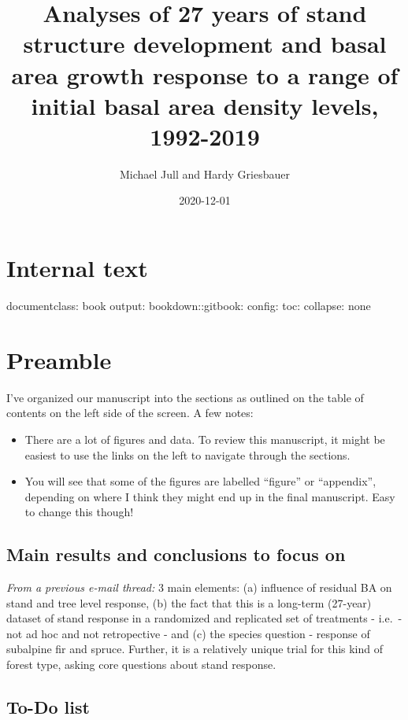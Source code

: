 \documentclass[
]{article}
\title{Analyses of 27 years of stand structure development and basal area growth response to a range of initial basal area density levels, 1992-2019}
\author{Michael Jull and Hardy Griesbauer}
\date{2020-12-01}
\providecommand{\tightlist}{%
  \setlength{\itemsep}{0pt}\setlength{\parskip}{0pt}}
\begin{document}
\maketitle

{
\setcounter{tocdepth}{2}
\tableofcontents
}
\hypertarget{internal-text}{%
\section{Internal text}\label{internal-text}}

documentclass: book
output:
bookdown::gitbook:
config:
toc:
collapse: none

\hypertarget{preamble}{%
\section{Preamble}\label{preamble}}

I've organized our manuscript into the sections as outlined on the table of contents on the left side of the screen. A few notes:

\begin{itemize}
\tightlist
\item
  There are a lot of figures and data. To review this manuscript, it might be easiest to use the links on the left to navigate through the sections.
\item
  You will see that some of the figures are labelled ``figure'' or ``appendix'', depending on where I think they might end up in the final manuscript. Easy to change this though!
\end{itemize}

\hypertarget{main-results-and-conclusions-to-focus-on}{%
\subsection{Main results and conclusions to focus on}\label{main-results-and-conclusions-to-focus-on}}

\emph{From a previous e-mail thread:}
3 main elements: (a) influence of residual BA on stand and tree level response, (b) the fact that this is a long-term (27-year) dataset of stand response in a randomized and replicated set of treatments - i.e.~- not ad hoc and not retropective - and (c) the species question - response of subalpine fir and spruce. Further, it is a relatively unique trial for this kind of forest type, asking core questions about stand response.

\hypertarget{to-do-list}{%
\subsection{To-Do list}\label{to-do-list}}
\end{document}
